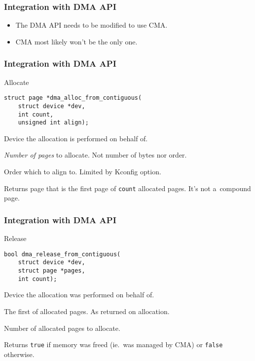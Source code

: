 \begin{frame}
  \frametitle{Integration with DMA API}

  \begin{itemize}
  \item The DMA API needs to be modified to use CMA.
  \item CMA most likely won't be the only one.
  \end{itemize}
\end{frame}

\begin{frame}[fragile]
  \frametitle{Integration with DMA API}

  \begin{block}{Allocate}
\begin{lstlisting}
struct page *dma_alloc_from_contiguous(
    struct device *dev,
    int count,
    unsigned int align);
\end{lstlisting}
  \end{block}

  \begin{description}[count]
  \item[dev] Device the allocation is performed on behalf of.
  \item[count] \emph{Number of pages} to allocate. {\footnotesize Not
    number of bytes nor order.}
  \item[align] Order which to align to.  Limited by Kconfig option.
  \item Returns page that is the first page of \lstinline|count|
    allocated pages. {\footnotesize It's not a~compound page.}
  \end{description}
\end{frame}

\begin{frame}[fragile]
  \frametitle{Integration with DMA API}

  \begin{block}{Release}
\begin{lstlisting}
bool dma_release_from_contiguous(
    struct device *dev,
    struct page *pages,
    int count);
\end{lstlisting}
  \end{block}

  \begin{description}[count]
  \item[dev] Device the allocation was performed on behalf of.
  \item[pages] The first of allocated pages. {\footnotesize As
    returned on allocation.}
  \item[count] Number of allocated pages to allocate.
  \item Returns \lstinline|true| if memory was freed (ie.\ was managed
    by CMA) or \lstinline|false| otherwise.
  \end{description}
\end{frame}

